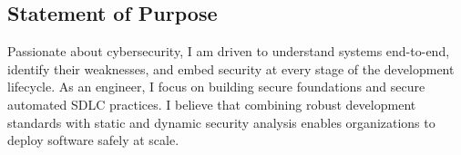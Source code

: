 \documentclass[mm, 11pt]{simple_style}
\begin{document}
\begin{resume}
\section{Statement of Purpose}
Passionate about cybersecurity, I am driven to understand systems end-to-end,
identify their weaknesses, and embed security at every stage of the development
lifecycle. As an engineer, I focus on building secure foundations and secure automated
SDLC practices. I believe that combining robust development standards
with static and dynamic security analysis enables organizations to deploy software
safely at scale.

\sectionline


\end{resume}
\end{document}
